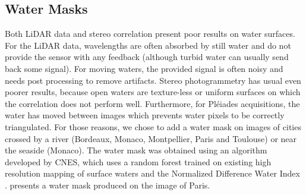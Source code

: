 \subsection{Water Masks}
Both LiDAR data and stereo correlation present poor results on water surfaces. For the LiDAR data, wavelengths are often absorbed by still water and do not provide the sensor with any feedback (although turbid water can usually send back some signal). For moving waters, the provided signal is often noisy and needs post processing to remove artifacts. Stereo photogrammetry has usual even poorer results, because open waters are texture-less or uniform surfaces on which the correlation does not perform well. Furthermore, for Pléiades acquisitions, the water has moved between images which prevents water pixels to be correctly triangulated. For those reasons, we chose to add a water mask on images of cities crossed by a river (Bordeaux, Monaco, Montpellier, Paris and Toulouse) or near the seaside (Monaco). The water mask was obtained using an algorithm developed by CNES, which uses a random forest trained on existing high resolution mapping of surface waters \cite{pekel_high-resolution_2016} and the Normalized Difference Water Index \cite{gao_ndwinormalized_1996}.  presents a water mask produced on the image of Paris.

